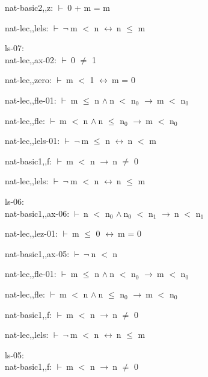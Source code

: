 \documentclass[a4paper]{article}
\newcommand{\Fol}{\mbox{$\vdash\ $}}
\newcommand{\Not}{\mbox{$\neg\ $}}
\newcommand{\And}{\mbox{$\wedge\ $}}
\newcommand{\Imp}{\mbox{$\rightarrow\ $}}
\newcommand{\Equiv}{\mbox{$\leftrightarrow\ $}}
\begin{document}
nat-basic2,,z: 
 \Fol 0 + m = m



nat-lec,,lels: 
 \Fol \Not m $<$ n \Equiv n $\le$ m



\bigskip

ls-07:\\ nat-lec,,ax-02: 
 \Fol 0 $\neq$ 1



nat-lec,,zero: 
 \Fol m $<$ 1 \Equiv m = 0



nat-lec,,fle-01: 
 \Fol m $\le$ n \And n $<$ $\mbox{n}_{0}$ \Imp m $<$ $\mbox{n}_{0}$



nat-lec,,fle: 
 \Fol m $<$ n \And n $\le$ $\mbox{n}_{0}$ \Imp m $<$ $\mbox{n}_{0}$



nat-lec,,lels-01: 
 \Fol \Not m $\le$ n \Equiv n $<$ m



nat-basic1,,f: 
 \Fol m $<$ n \Imp n $\neq$ 0



nat-lec,,lels: 
 \Fol \Not m $<$ n \Equiv n $\le$ m



\bigskip

ls-06:\\ nat-basic1,,ax-06: 
 \Fol n $<$ $\mbox{n}_{0}$ \And $\mbox{n}_{0}$ $<$ $\mbox{n}_{1}$ \Imp n $<$ $\mbox{n}_{1}$

nat-lec,,lez-01: 
 \Fol m $\le$ 0 \Equiv m = 0



nat-basic1,,ax-05: 
 \Fol \Not n $<$ n



nat-lec,,fle-01: 
 \Fol m $\le$ n \And n $<$ $\mbox{n}_{0}$ \Imp m $<$ $\mbox{n}_{0}$



nat-lec,,fle: 
 \Fol m $<$ n \And n $\le$ $\mbox{n}_{0}$ \Imp m $<$ $\mbox{n}_{0}$



nat-basic1,,f: 
 \Fol m $<$ n \Imp n $\neq$ 0



nat-lec,,lels: 
 \Fol \Not m $<$ n \Equiv n $\le$ m



\bigskip

ls-05:\\ nat-basic1,,f: 
 \Fol m $<$ n \Imp n $\neq$ 0
\end{document}
